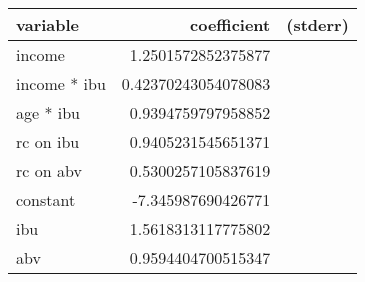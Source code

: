 \begin{tabular}{lrr}
\textbf{variable}&\textbf{coefficient}&\textbf{(stderr)}\\
\hline

income&1.2501572852375877&\\
income * ibu&0.42370243054078083&\\
age * ibu&0.9394759797958852&\\
rc on ibu&0.9405231545651371&\\
rc on abv&0.5300257105837619&\\
constant&-7.345987690426771&\\
ibu&1.5618313117775802&\\
abv&0.9594404700515347&\\
\end{tabular}

